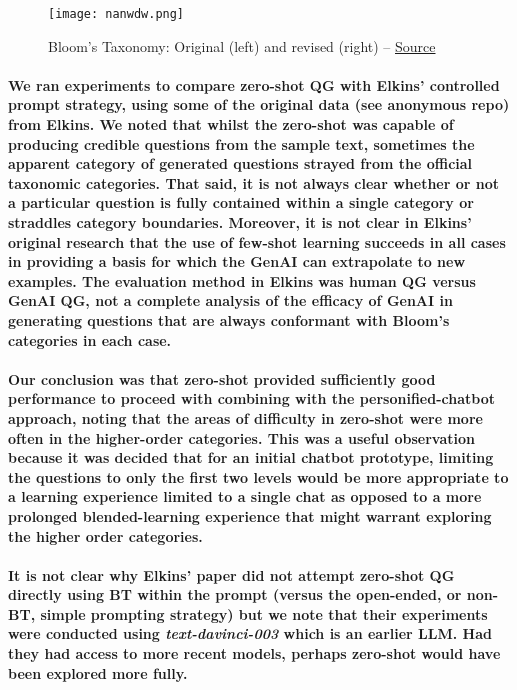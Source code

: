 \documentclass{article}
\begin{document}
\begin{figure}[h!tbp]
    \centering
    \texttt{[image: nanwdw.png]}
    \caption{Bloom's Taxonomy: Original (left) and revised (right) -- \href{https://joanakompa.com/2017/02/07/why-it-is-time-to-retire-blooms-taxonomy/}{Source}}
    \label{fig:2}
\end{figure}

\paragraph{We ran experiments to compare zero-shot QG with Elkins’ controlled prompt strategy, using some of the original data (see anonymous repo) from Elkins. We noted that whilst the zero-shot was capable of producing credible questions from the sample text, sometimes the apparent category of generated questions strayed from the official taxonomic categories. That said, it is not always clear whether or not a particular question is fully contained within a single category or straddles category boundaries. Moreover, it is not clear in Elkins’ original research that the use of few-shot learning succeeds in all cases in providing a basis for which the GenAI can extrapolate to new examples. The evaluation method in Elkins was human QG versus GenAI QG, not a complete analysis of the efficacy of GenAI in generating questions that are always conformant with Bloom’s categories in each case.}

\paragraph{Our conclusion was that zero-shot provided sufficiently good performance to proceed with combining with the personified-chatbot approach, noting that the areas of difficulty in zero-shot were more often in the higher-order categories. This was a useful observation because it was decided that for an initial chatbot prototype, limiting the questions to only the first two levels would be more appropriate to a learning experience limited to a single chat as opposed to a more prolonged blended-learning experience that might warrant exploring the higher order categories.}

\paragraph{It is not clear why Elkins’ paper did not attempt zero-shot QG directly using BT within the prompt (versus the open-ended, or non-BT, simple prompting strategy) but we note that their experiments were conducted using \textit{text-davinci-003} which is an earlier LLM. Had they had access to more recent models, perhaps zero-shot would have been explored more fully.}
\end{document}
